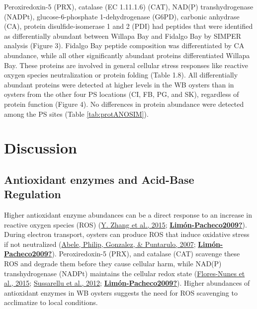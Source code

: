 \documentclass [11pt, proquest] {uwthesis}[2015/03/03]
\begin{document}
Peroxiredoxin-5 (PRX), catalase (EC 1.11.1.6) (CAT), NAD(P) transhydrogenase (NADPt), glucose-6-phosphate 1-dehydrogenase (G6PD), carbonic anhydrase (CA), protein disulfide-isomerase 1 and 2 (PDI) had peptides that were identified as differentially abundant between Willapa Bay and Fidalgo Bay by SIMPER analysis (Figure 3). Fidalgo Bay peptide composition was differentiated by CA abundance, while all other significantly abundant proteins differentiated Willapa Bay. These proteins are involved in general cellular stress responses like reactive oxygen species neutralization or protein folding (Table 1.8). All differentially abundant proteins were detected at higher levels in the WB oysters than in oysters from the other four PS locations (CI, FB, PG, and SK), regardless of protein function (Figure 4). No differences in protein abundance were detected among the PS sites (Table \ref{tab:protANOSIM}).

\hypertarget{discussion}{%
\section{Discussion}\label{discussion}}

\hypertarget{antioxidant-enzymes-and-acid-base-regulation}{%
\subsection{Antioxidant enzymes and Acid-Base Regulation}\label{antioxidant-enzymes-and-acid-base-regulation}}

Higher antioxidant enzyme abundances can be a direct response to an increase in reactive oxygen species (ROS) (\protect\hyperlink{ref-Zhang2015}{Y. Zhang et al., 2015}; \protect\hyperlink{ref-Limuxf3n-Pacheco2009}{\textbf{Limón-Pacheco2009?}}). During electron transport, oysters can produce ROS that induce oxidative stress if not neutralized (\protect\hyperlink{ref-Abele2007}{Abele, Philip, Gonzalez, \& Puntarulo, 2007}; \protect\hyperlink{ref-Limuxf3n-Pacheco2009}{\textbf{Limón-Pacheco2009?}}). Peroxiredoxin-5 (PRX), and catalase (CAT) scavenge these ROS and degrade them before they cause cellular harm, while NAD(P) transhydrogenase (NADPt) maintains the cellular redox state (\protect\hyperlink{ref-Flores-Nunes2015}{Flores-Nunes et al., 2015}; \protect\hyperlink{ref-Sussarellu2012}{Sussarellu et al., 2012}; \protect\hyperlink{ref-Limuxf3n-Pacheco2009}{\textbf{Limón-Pacheco2009?}}). Higher abundances of antioxidant enzymes in WB oysters suggests the need for ROS scavenging to acclimatize to local conditions.
\end{document}
